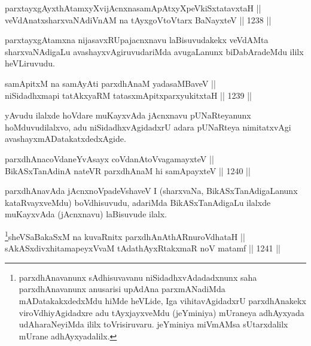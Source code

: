 \begin{shl}
parxtayxgAyxthAtamxyXvijAcnxnasamApAtxyX\s peVkiSxtatavxtaH ||  \\
veVdAnatxsharxvaNAdiVnAM na tAyxgoV\s toV\s tarx BaNayxteV \hfill || 1238 ||  
\end{shl}

\begin{artha}
parxtayxgAtamxna nijasavxRUpajacnxnavu laBisuvudakekx veVdAMta sharxvaNAdigaLu avashayxvAgiruvudariMda avugaLanunx biDabAradeMdu ililx heVLiruvudu.
\end{artha}


\begin{shl}
samApitxM na samAyAti parxdhAnaM yadasaMBaveV || \\
niSidadhxmapi tatAkxyaRM tatasxmApitxparxyukitxtaH \hfill || 1239 ||  
\end{shl}

\begin{artha}
yAvudu ilalxde hoVdare muKayxvAda jAcnxnavu pUNaRteyanunx hoMduvudilalxvo, adu niSidadhxvAgidadxrU adara pUNaRteya nimitatxvAgi avashayxmADatakatxdedxAgide.
\end{artha}


\begin{shl}
parxdhAnacoVdaneYvAsayx coVdanAtoV\s vagamayxteV || \\
BikASxTanAdinA nateVR parxdhAnaM hi samApayxteV \hfill || 1240 ||  
\end{shl}

\begin{artha}
parxdhAnavAda jAcnxnoVpadeVshaveV I (sharxvaNa, BikASxTanAdigaLanunx kataRvayxveMdu) boVdhisuvudu, adariMda BikASxTanAdigaLu  ilalxde muKayxvAda (jAcnxnavu) laBisuvude ilalx.
\end{artha}


\begin{shl}
\footnote{parxdhAnavanunx sAdhisuvavanu niSidadhxvAdadadxnunx saha parxdhAnavanunx anusarisi upAdAna parxmANadiMda mADatakakxdedxMdu hiMde heVLide, Iga vihitavAgidadxrU parxdhAnakekx viroVdhiyAgidadxre adu tAyxjayxveMdu (jeYminiya) mUraneya adhAyxyada udAharaNeyiMda ililx toVrisiruvaru. jeYminiya miVmAMsa sUtarxdalilx mUrane adhAyxyadalilx.}sheVSaBakaSxM na kuvaRnitx parxdhAnAthARnuroVdhataH || \\
sAkASxdivxhitamapeyxVvaM tAdathAyxRtakxmaR noV matamf \hfill || 1241 ||  
\end{shl}

